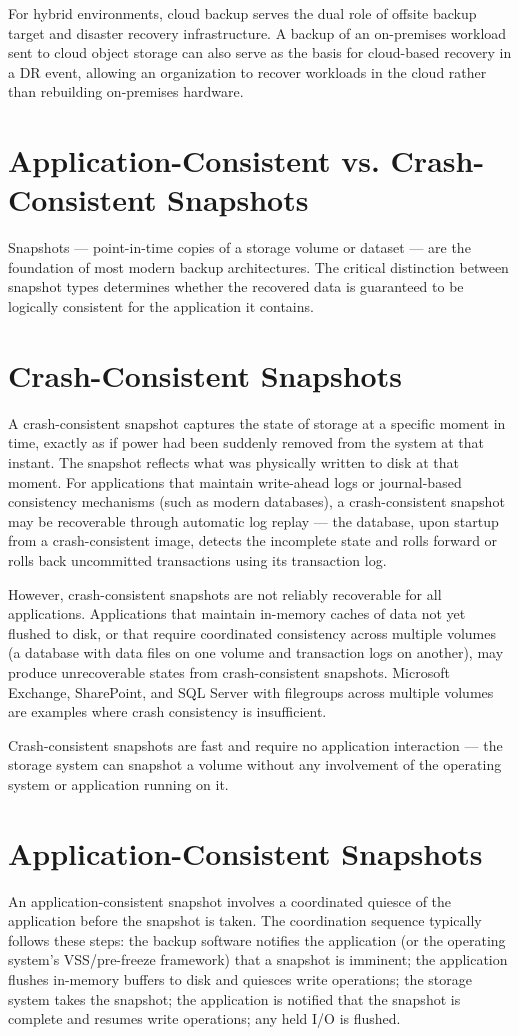 For hybrid environments, cloud backup serves the dual role of offsite backup target and disaster recovery infrastructure. A backup of an on-premises workload sent to cloud object storage can also serve as the basis for cloud-based recovery in a DR event, allowing an organization to recover workloads in the cloud rather than rebuilding on-premises hardware.

\section{Application-Consistent vs. Crash-Consistent Snapshots}
Snapshots --- point-in-time copies of a storage volume or dataset --- are the foundation of most modern backup architectures. The critical distinction between snapshot types determines whether the recovered data is guaranteed to be logically consistent for the application it contains.

\section{Crash-Consistent Snapshots}
A crash-consistent snapshot captures the state of storage at a specific moment in time, exactly as if power had been suddenly removed from the system at that instant. The snapshot reflects what was physically written to disk at that moment. For applications that maintain write-ahead logs or journal-based consistency mechanisms (such as modern databases), a crash-consistent snapshot may be recoverable through automatic log replay --- the database, upon startup from a crash-consistent image, detects the incomplete state and rolls forward or rolls back uncommitted transactions using its transaction log.

However, crash-consistent snapshots are not reliably recoverable for all applications. Applications that maintain in-memory caches of data not yet flushed to disk, or that require coordinated consistency across multiple volumes (a database with data files on one volume and transaction logs on another), may produce unrecoverable states from crash-consistent snapshots. Microsoft Exchange, SharePoint, and SQL Server with filegroups across multiple volumes are examples where crash consistency is insufficient.

Crash-consistent snapshots are fast and require no application interaction --- the storage system can snapshot a volume without any involvement of the operating system or application running on it.

\section{Application-Consistent Snapshots}
An application-consistent snapshot involves a coordinated quiesce of the application before the snapshot is taken. The coordination sequence typically follows these steps: the backup software notifies the application (or the operating system's VSS/pre-freeze framework) that a snapshot is imminent; the application flushes in-memory buffers to disk and quiesces write operations; the storage system takes the snapshot; the application is notified that the snapshot is complete and resumes write operations; any held I/O is flushed.

